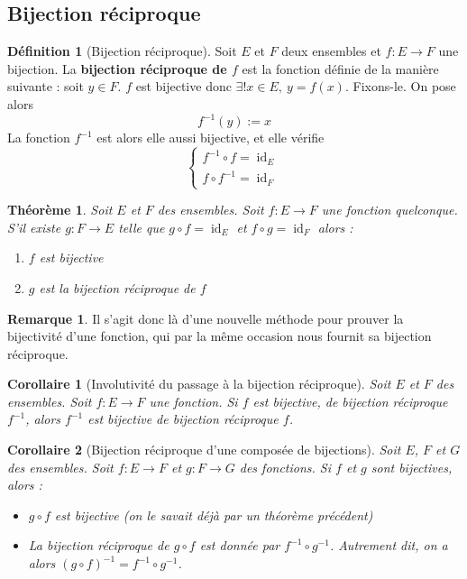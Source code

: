 \documentclass[french]{book}
\newcommand{\inv}{^{-1}}
\theoremstyle{plain}
\newtheorem{thm}{Théorème}[chapter]
\newtheorem{cor}{Corollaire}[chapter]
\theoremstyle{definition}
\newtheorem{dfn}{Définition}[chapter]
\newtheorem{rmq}{Remarque}[chapter]
\theoremstyle{remark}
\DeclareMathOperator{\id}{id}
\begin{document}
\subsection{Bijection réciproque}
\begin{dfn}[Bijection réciproque]
	Soit $E$ et $F$ deux ensembles et $f:E\rightarrow F$ une bijection. La \textbf{bijection réciproque de $f$} est la fonction définie de la manière suivante : soit $y\in F$. $f$ est bijective donc $\exists!x\in E,\ y=f(x)$. Fixons-le. On pose alors $$f\inv(y):=x$$ La fonction $f\inv$ est alors elle aussi bijective, et elle vérifie $$\begin{cases}
		f\inv\circ f=\id_E \\ f\circ f\inv=\id_F
	\end{cases}$$
\end{dfn}
\begin{thm}
	Soit $E$ et $F$ des ensembles. Soit $f:E\rightarrow F$ une fonction quelconque. S'il existe $g:F\rightarrow E$ telle que $g\circ f =\id_E$ et $f\circ g=\id_F$ alors : 
	\begin{enumerate}
		\item $f$ est bijective
		\item $g$ est la bijection réciproque de $f$
	\end{enumerate}
\end{thm}
\begin{rmq}
	Il s'agit donc là d'une nouvelle méthode pour prouver la bijectivité d'une fonction, qui par la même occasion nous fournit sa bijection réciproque.
\end{rmq}
\begin{cor}[Involutivité du passage à la bijection réciproque]
	Soit $E$ et $F$ des ensembles. Soit $f:E\rightarrow F$ une fonction. Si $f$ est bijective, de bijection réciproque $f\inv$, alors $f\inv$ est bijective de bijection réciproque $f$.
\end{cor}
\begin{cor}[Bijection réciproque d'une composée de bijections]
	Soit $E$, $F$ et $G$ des ensembles. Soit $f:E\rightarrow F$ et $g:F\rightarrow G$ des fonctions. Si $f$ et $g$ sont bijectives, alors : 
	\begin{itemize}
		\item $g\circ f$ est bijective (on le savait déjà par un théorème précédent)
		\item La bijection réciproque de $g\circ f$ est donnée par $f\inv\circ g\inv$. Autrement dit, on a alors $(g\circ f)\inv=f\inv\circ g\inv$.
	\end{itemize}
\end{cor}
\end{document}
